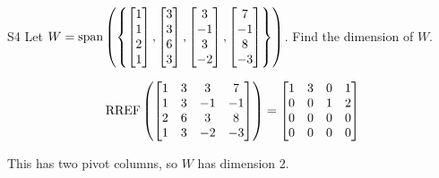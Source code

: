 \begin{problem}{S4}
Let \(W = \operatorname{span} \left( \left\{ \begin{bmatrix} 1 \\ 1 \\ 2 \\ 1 \end{bmatrix}, \begin{bmatrix} 3 \\ 3 \\ 6 \\ 3 \end{bmatrix}, \begin{bmatrix} 3 \\ -1 \\ 3 \\ -2 \end{bmatrix}, \begin{bmatrix} 7 \\ -1 \\ 8 \\ -3 \end{bmatrix} \right\} \right)\).  Find the dimension of \(W\).
\end{problem}
\begin{solution}
\[\operatorname{RREF}\left(\begin{bmatrix} 1 & 3 & 3 & 7 \\ 1 & 3 & -1 & -1 \\ 2 & 6 & 3 & 8 \\ 1 & 3 & -2 & -3 \end{bmatrix}\right) = \begin{bmatrix} 1 & 3 & 0 & 1 \\ 0 & 0 & 1 & 2 \\ 0 & 0 & 0 & 0 \\  0 & 0 & 0 & 0 \end{bmatrix}\]

This has two pivot columns, so \(W\) has dimension 2.
\end{solution}


